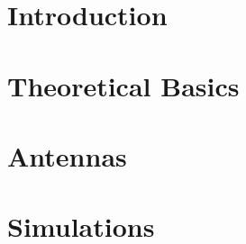 \documentclass[11pt]{article}
\begin{document}
\newpage
	\listoffigures 

\newpage
	\listoftables
	
\cleardoublepage

\pagestyle{headings}

\section{Introduction}

\section{Theoretical Basics}








\section{Antennas}


\section{Simulations}\label{sec:simulations}



\newpage

\iffalse
\subsection{Summary}

\fi
\cleardoublepage
\printbibliography
\end{document}
